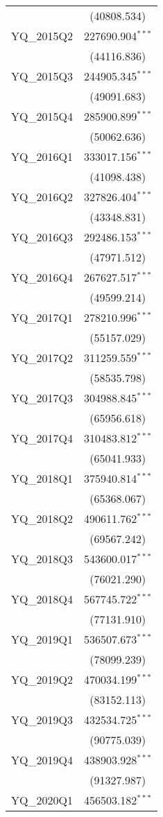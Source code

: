 \begin{table}[!htbp]
\begin{tabular}{@{\extracolsep{5pt}}lc}
& (40808.534) \\
 YQ_2015Q2 & 227690.904$^{***}$ \\
& (44116.836) \\
 YQ_2015Q3 & 244905.345$^{***}$ \\
& (49091.683) \\
 YQ_2015Q4 & 285900.899$^{***}$ \\
& (50062.636) \\
 YQ_2016Q1 & 333017.156$^{***}$ \\
& (41098.438) \\
 YQ_2016Q2 & 327826.404$^{***}$ \\
& (43348.831) \\
 YQ_2016Q3 & 292486.153$^{***}$ \\
& (47971.512) \\
 YQ_2016Q4 & 267627.517$^{***}$ \\
& (49599.214) \\
 YQ_2017Q1 & 278210.996$^{***}$ \\
& (55157.029) \\
 YQ_2017Q2 & 311259.559$^{***}$ \\
& (58535.798) \\
 YQ_2017Q3 & 304988.845$^{***}$ \\
& (65956.618) \\
 YQ_2017Q4 & 310483.812$^{***}$ \\
& (65041.933) \\
 YQ_2018Q1 & 375940.814$^{***}$ \\
& (65368.067) \\
 YQ_2018Q2 & 490611.762$^{***}$ \\
& (69567.242) \\
 YQ_2018Q3 & 543600.017$^{***}$ \\
& (76021.290) \\
 YQ_2018Q4 & 567745.722$^{***}$ \\
& (77131.910) \\
 YQ_2019Q1 & 536507.673$^{***}$ \\
& (78099.239) \\
 YQ_2019Q2 & 470034.199$^{***}$ \\
& (83152.113) \\
 YQ_2019Q3 & 432534.725$^{***}$ \\
& (90775.039) \\
 YQ_2019Q4 & 438903.928$^{***}$ \\
& (91327.987) \\
 YQ_2020Q1 & 456503.182$^{***}$ \\

\end{tabular}
\end{table}
